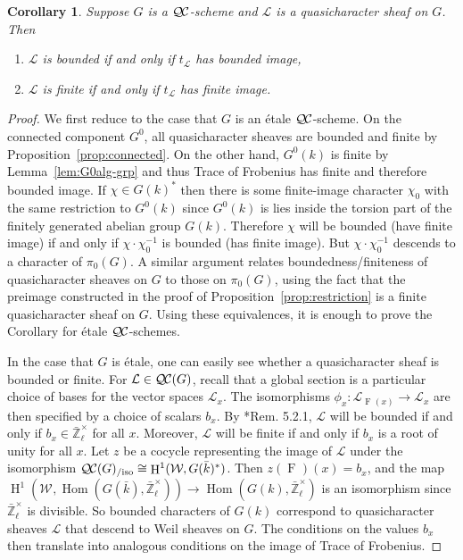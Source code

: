 \documentclass{amsart}
\theoremstyle{plain}
\newtheorem{corollary}[theorem]{Corollary}
\theoremstyle{definition}
\theoremstyle{remark}
\newcommand{\bFq}{\bar{k}}
\newcommand{\Fq}{k}
\newcommand{\Zlx}{\mathbb{\bar Z}_\ell^\times}
\newcommand{\Weil}[1]{\mathcal{W}_{#1}}
\newcommand{\Frob}[1]{\operatorname{F}_{#1}}
\DeclareMathOperator{\Hom}{Hom}
\DeclareMathOperator{\Hh}{H}
\newcommand{\qcs}[1]{{\mathcal{#1}}}
\newcommand{\QC}{{\mathcal{Q\hskip-0.8pt C}}}
\newcommand{\QCiso}[1]{\QC(#1)_{/\text{iso}}}
\newcommand{\trFrob}[1]{t_{#1}}
\begin{document}
\begin{corollary} \label{cor:bounded-and-finite}
Suppose $G$ is a $\QC$-scheme and $\qcs{L}$ is a quasicharacter sheaf on $G$.  Then
\begin{enumerate}
\item $\qcs{L}$ is bounded if and only if $\trFrob{\qcs{L}}$ has bounded image,
\item $\qcs{L}$ is finite if and only if $\trFrob{\qcs{L}}$ has finite image.
\end{enumerate}
\end{corollary}
\begin{proof}
We first reduce to the case that $G$ is an \'etale $\QC$-scheme.  On the connected component
$G^0$, all quasicharacter sheaves are bounded and finite by Proposition~\ref{prop:connected}.
On the other hand, $G^0(\Fq)$ is finite by Lemma~\ref{lem:G0alg-grp} and thus Trace of Frobenius
has finite and therefore bounded image.  If $\chi \in G(\Fq)^*$ then there is some finite-image character $\chi_0$
with the same restriction to $G^0(\Fq)$ since $G^0(\Fq)$ is lies inside the torsion part of
the finitely generated abelian group $G(\Fq)$.  Therefore $\chi$ will be bounded (have finite image)
if and only if $\chi \cdot \chi_0^{-1}$ is bounded (has finite image).  But $\chi \cdot \chi_0^{-1}$ descends
to a character of $\pi_0(G)$.  A similar argument relates boundedness/finiteness of quasicharacter
sheaves on $G$ to those on $\pi_0(G)$, using the fact that the preimage constructed in the proof of
Proposition~\ref{prop:restriction} is a finite quasicharacter sheaf on $G$.
Using these equivalences, it is enough to prove the Corollary
for \'etale $\QC$-schemes.

In the case that $G$ is \'etale, one can easily see whether a quasicharacter sheaf is bounded or finite.
For $\qcs{L} \in \QC(G)$, recall that a global section is a particular choice of bases for the vector
spaces $\qcs{L}_x$.  The isomorphisms $\phi_x : \qcs{L}_{\Frob{}(x)} \to \qcs{L}_x$ are then specified
by a choice of scalars $b_x$.  By \cite{beilinson-bernstein-deligne:81a}*{Rem. 5.2.1},
$\qcs{L}$ will be bounded if and only if $b_x \in \Zlx$ for all $x$.  Moreover, $\qcs{L}$ will be
finite if and only if $b_x$ is a root of unity for all $x$.
Let $z$ be a cocycle representing the image of $\qcs{L}$ under the isomorphism
$\QCiso{G} \cong \Hh^1(\Weil{}, G(\bFq)^*)$.  Then $z(\Frob{})(x) = b_x$, and the
map $\Hh^1(\Weil{}, \Hom(G(\bFq), \Zlx)) \to \Hom(G(\Fq), \Zlx)$ is an isomorphism
since $\Zlx$ is divisible.  So bounded characters of $G(\Fq)$ correspond to quasicharacter sheaves
$\qcs{L}$ that descend to Weil sheaves on $G$.  The conditions on the values $b_x$ then
translate into analogous conditions on the image of Trace of Frobenius.
\end{proof}
\end{document}
